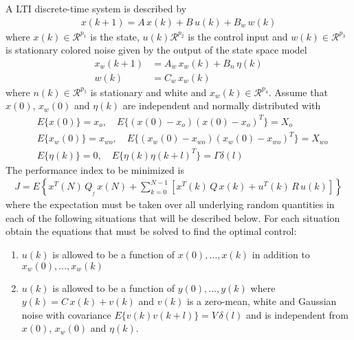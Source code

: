 \item
A LTI discrete-time system is described by
\begin{align*}
    x(k+1) = A \, x(k) + B\, u(k) + B_w \, w(k)
\end{align*}
where $x(k) \in \mathcal{R}^{p_1}$ is the state, $u(k) \mathcal{R}^{p_2}$ is the control input and $w(k) \in \mathcal{R}^{p_3}$ is stationary colored noise given by the output of the state space model
\begin{align*}
    x_w(k+1) & = A_w \, x_w(k) + B_n \, \eta(k) \\
    w(k) & = C_w \, x_w(k)
\end{align*}
where $n(k) \in \mathcal{R}^{p_5}$ is stationary and white and $x_w(k) \in \mathcal{R}^{p_4}$. Assume that $x(0)$, $x_w(0)$  and $\eta(k)$ are independent and normally distributed with
\begin{align*}
    &E\{ x(0) \} = x_o, \hspace{1em} E\{ (x(0) - x_o)(x(0) - x_o)^T \} = X_o\\
    &E\{ x_w(0) \} = x_{wo}, \hspace{1em} E\{ (x_{w}(0) - x_{wo})(x_{w}(0) - x_{wo})^T \} = X_{wo}\\
    &E\{ \eta(k) \} = 0, \hspace{1em} E\{ \eta(k)\eta(k+l)^T \} = \Gamma \delta(l)
\end{align*}
The performance index to be minimized is
\begin{align*}
    J = E \left \{ x^T(N)\,  Q_{_f} \, x(N) + \sum_{k=0}^{N-1}
        \left [x^T(k)\,  Q \, x(k) + u^T(k)\,  R \, u(k) \right ] \right \}
\end{align*}
where the expectation must be taken over all underlying  random quantities in each of the following situations that will be described below. For each situation obtain the equations that must be solved to find the optimal control:

\begin{enumerate}
\item
$u(k)$ is allowed to be a function of $x(0),\ldots,x(k)$ in addition to $x_w(0),\ldots,x_w(k)$

\item
$u(k)$ is allowed to be a function of $y(0),\ldots,y(k)$ where $y(k) = C \, x(k) + v(k)$ and $v(k)$ is a zero-mean, white and Gaussian noise with covariance $E\{ v(k) v(k+l) \} = V\,\delta(l)$ and is independent from $x(0)$, $x_w(0)$ and $\eta(k)$.


\end{enumerate} 